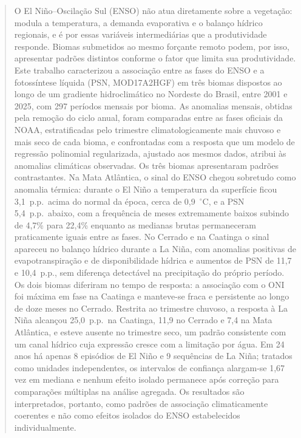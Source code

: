 \documentclass[a4paper,fleqn]{cas-sc}
\begin{document}
\begin{abstract}
O El Niño--Oscilação Sul (ENSO) não atua diretamente sobre a vegetação: modula a temperatura, a demanda evaporativa e o balanço hídrico regionais, e é por essas variáveis intermediárias que a produtividade responde. Biomas submetidos ao mesmo forçante remoto podem, por isso, apresentar padrões distintos conforme o fator que limita sua produtividade. Este trabalho caracterizou a associação entre as fases do ENSO e a fotossíntese líquida (PSN, MOD17A2HGF) em três biomas dispostos ao longo de um gradiente hidroclimático no Nordeste do Brasil, entre 2001 e 2025, com 297 períodos mensais por bioma. As anomalias mensais, obtidas pela remoção do ciclo anual, foram comparadas entre as fases oficiais da NOAA, estratificadas pelo trimestre climatologicamente mais chuvoso e mais seco de cada bioma, e confrontadas com a resposta que um modelo de regressão polinomial regularizada, ajustado aos mesmos dados, atribui às anomalias climáticas observadas. Os três biomas apresentaram padrões contrastantes. Na Mata Atlântica, o sinal do ENSO chegou sobretudo como anomalia térmica: durante o El Niño a temperatura da superfície ficou 3,1~p.p.\ acima do normal da época, cerca de 0,9~$^{\circ}$C, e a PSN 5,4~p.p.\ abaixo, com a frequência de meses extremamente baixos subindo de 4,7\% para 22,4\% enquanto as medianas brutas permaneceram praticamente iguais entre as fases. No Cerrado e na Caatinga o sinal apareceu no balanço hídrico durante a La Niña, com anomalias positivas de evapotranspiração e de disponibilidade hídrica e aumentos de PSN de 11,7 e 10,4~p.p., sem diferença detectável na precipitação do próprio período. Os dois biomas diferiram no tempo de resposta: a associação com o ONI foi máxima em fase na Caatinga e manteve-se fraca e persistente ao longo de doze meses no Cerrado. Restrita ao trimestre chuvoso, a resposta à La Niña alcançou 25,0~p.p.\ na Caatinga, 11,9 no Cerrado e 7,4 na Mata Atlântica, e esteve ausente no trimestre seco, um padrão consistente com um canal hídrico cuja expressão cresce com a limitação por água. Em 24 anos há apenas 8 episódios de El Niño e 9 sequências de La Niña; tratados como unidades independentes, os intervalos de confiança alargam-se 1,67 vez em mediana e nenhum efeito isolado permanece após correção para comparações múltiplas na análise agregada. Os resultados são interpretados, portanto, como padrões de associação climaticamente coerentes e não como efeitos isolados do ENSO estabelecidos individualmente.
\end{abstract}
\end{document}

